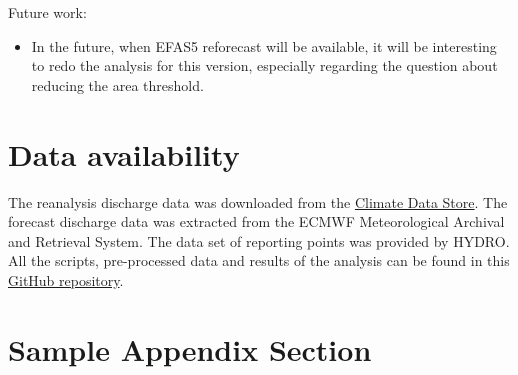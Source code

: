 \documentclass[preprint,12pt]{elsarticle}
\begin{document}
Future work:

\begin{itemize}
\item In the future, when EFAS5 reforecast will be available, it will be interesting to redo the analysis for this version, especially regarding the question about reducing the area threshold.
\end{itemize}

\section{Data availability}

The reanalysis discharge data was downloaded from the \href{https://cds.climate.copernicus.eu}{Climate Data Store}. The forecast discharge data was extracted from the ECMWF Meteorological Archival and Retrieval System. The data set of reporting points was provided by HYDRO. All the scripts, pre-processed data and results of the analysis can be found in this \href{https://github.com/casadoj/EFAS_skill}{GitHub repository}.

\appendix

\section{Sample Appendix Section}
\label{sec:sample:appendix}


  
 





\end{document}
